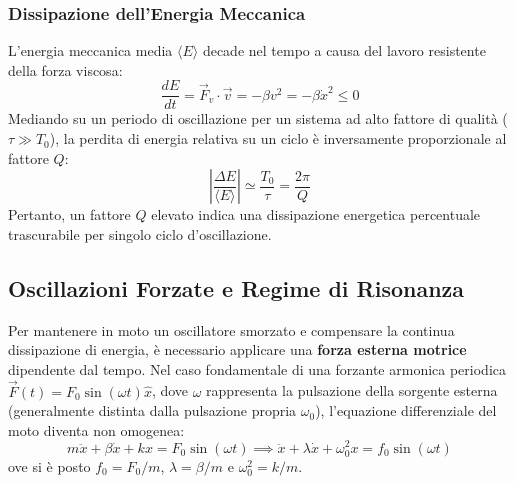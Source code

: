 \subsubsection*{Dissipazione dell'Energia Meccanica}
L'energia meccanica media $\langle E \rangle$ decade nel tempo a causa del lavoro resistente della forza viscosa:
\begin{equation}
    \frac{dE}{dt} = \vec{F}_v \cdot \vec{v} = -\beta v^2 = -\beta \dot{x}^2 \le 0
\end{equation}
Mediando su un periodo di oscillazione per un sistema ad alto fattore di qualità ($\tau \gg T_0$), la perdita di energia relativa su un ciclo è inversamente proporzionale al fattore $Q$:
\begin{equation}
    \left| \frac{\Delta E}{\langle E \rangle} \right| \simeq \frac{T_0}{\tau} = \frac{2\pi}{Q}
\end{equation}
Pertanto, un fattore $Q$ elevato indica una dissipazione energetica percentuale trascurabile per singolo ciclo d'oscillazione.




\subsection{Oscillazioni Forzate e Regime di Risonanza}
Per mantenere in moto un oscillatore smorzato e compensare la continua dissipazione di energia, è necessario applicare una \textbf{forza esterna motrice} dipendente dal tempo. Nel caso fondamentale di una forzante armonica periodica $\vec{F}(t) = F_0 \sin(\omega t)\hat{x}$, dove $\omega$ rappresenta la pulsazione della sorgente esterna (generalmente distinta dalla pulsazione propria $\omega_0$), l'equazione differenziale del moto diventa non omogenea:
\begin{equation}
    m\ddot{x} + \beta\dot{x} + kx = F_0 \sin(\omega t) \implies \ddot{x} + \lambda\dot{x} + \omega_0^2 x = f_0 \sin(\omega t)
\end{equation}
ove si è posto $f_0 = F_0/m$, $\lambda = \beta/m$ e $\omega_0^2 = k/m$.

